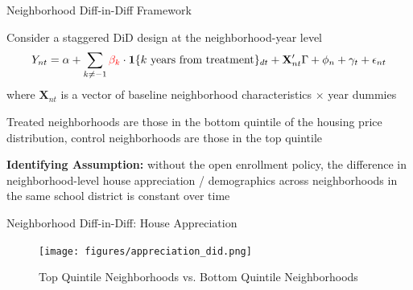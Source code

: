 \documentclass[notes,11pt, aspectratio=169]{beamer}
\newenvironment{wideitemize}{\itemize\addtolength{\itemsep}{10pt}}{\enditemize}
\begin{document}

\begin{frame}{Neighborhood Diff-in-Diff Framework}
\begin{wideitemize}
\item Consider a staggered DiD design at the neighborhood-year level\[Y_{nt} = \alpha + \sum_{k \ne -1 } \textcolor{red}{\beta_k} \cdot \mathbf{1}\{\text{$k$ years from treatment}\}_{dt} + \mathbf{X}_{nt}' \Gamma + \phi_n + \gamma_t + \epsilon_{nt} \]
where $\mathbf{X}_{nt}$ is a vector of baseline neighborhood characteristics $\times$ year dummies
\item Treated neighborhoods are those in the bottom quintile of the housing price distribution, control neighborhoods are those in the top quintile
\item \textbf{Identifying Assumption:} without the open enrollment policy, the difference in neighborhood-level house appreciation / demographics across neighborhoods in the same school district is constant over time
\end{wideitemize}
\end{frame}

\begin{frame}{Neighborhood Diff-in-Diff: House Appreciation}
\begin{figure}
\centering
\texttt{[image: figures/appreciation\_did.png]}
\caption{Top Quintile Neighborhoods vs. Bottom Quintile Neighborhoods}
\end{figure}
\end{frame}





\end{document}

